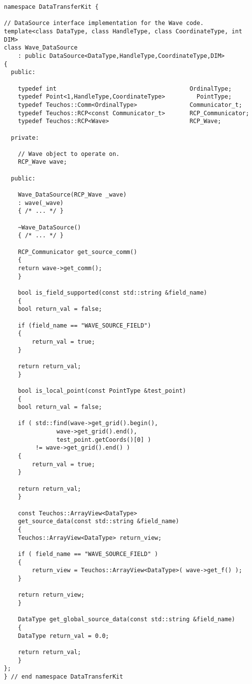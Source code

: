 \documentclass[letterpaper]{article}
\begin{document}
\begin{lstlisting}
namespace DataTransferKit {

// DataSource interface implementation for the Wave code.
template<class DataType, class HandleType, class CoordinateType, int DIM>
class Wave_DataSource 
    : public DataSource<DataType,HandleType,CoordinateType,DIM>
{
  public:

    typedef int                                      OrdinalType;
    typedef Point<1,HandleType,CoordinateType>         PointType;
    typedef Teuchos::Comm<OrdinalType>               Communicator_t;
    typedef Teuchos::RCP<const Communicator_t>       RCP_Communicator;
    typedef Teuchos::RCP<Wave>                       RCP_Wave;

  private:

    // Wave object to operate on.
    RCP_Wave wave;

  public:

    Wave_DataSource(RCP_Wave _wave)
	: wave(_wave)
    { /* ... */ }

    ~Wave_DataSource()
    { /* ... */ }

    RCP_Communicator get_source_comm()
    {
	return wave->get_comm();
    }

    bool is_field_supported(const std::string &field_name)
    {
	bool return_val = false;

	if (field_name == "WAVE_SOURCE_FIELD")
	{
	    return_val = true;
	}

	return return_val;
    }

    bool is_local_point(const PointType &test_point)
    {
	bool return_val = false;

	if ( std::find(wave->get_grid().begin(), 
		       wave->get_grid().end(),
		       test_point.getCoords()[0] )
	     != wave->get_grid().end() )
	{
	    return_val = true;
	}

	return return_val;
    }

    const Teuchos::ArrayView<DataType> 
    get_source_data(const std::string &field_name)
    {
	Teuchos::ArrayView<DataType> return_view;

	if ( field_name == "WAVE_SOURCE_FIELD" )
	{
	    return_view = Teuchos::ArrayView<DataType>( wave->get_f() );
	}

	return return_view;
    }

    DataType get_global_source_data(const std::string &field_name)
    {
	DataType return_val = 0.0;

	return return_val;
    }
};
} // end namespace DataTransferKit
\end{lstlisting}
\end{document}
